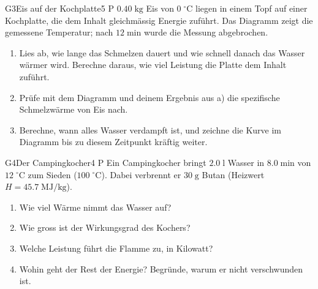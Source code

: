 \documentclass[11pt]{article}
\begin{document}
\begin{lpaufgabe}{G3}{Eis auf der Kochplatte}{5 P}
\(0.40\;\text{kg}\) Eis von \(0\;^\circ\text{C}\) liegen in einem Topf auf einer Kochplatte, die dem Inhalt gleichmässig Energie zuführt. Das Diagramm zeigt die gemessene Temperatur; nach \(12\;\text{min}\) wurde die Messung abgebrochen.\par\smallskip
\begin{center}\end{center}
\begin{enumerate}[label=\alph*),leftmargin=*,itemsep=2pt,topsep=2pt]
\item Lies ab, wie lange das Schmelzen dauert und wie schnell danach das Wasser wärmer wird. Berechne daraus, wie viel Leistung die Platte dem Inhalt zuführt.
\item Prüfe mit dem Diagramm und deinem Ergebnis aus a) die spezifische Schmelzwärme von Eis nach.
\item Berechne, wann alles Wasser verdampft ist, und zeichne die Kurve im Diagramm bis zu diesem Zeitpunkt kräftig weiter.
\end{enumerate}
\end{lpaufgabe}


\begin{lpaufgabe}{G4}{Der Campingkocher}{4 P}
Ein Campingkocher bringt \(2.0\;\text{l}\) Wasser in \(8.0\;\text{min}\) von \(12\;^\circ\text{C}\) zum Sieden (\(100\;^\circ\text{C}\)). Dabei verbrennt er \(30\;\text{g}\) Butan (Heizwert \(H = 45.7\;\text{MJ/kg}\)).
\begin{enumerate}[label=\alph*),leftmargin=*,itemsep=2pt,topsep=2pt]
\item Wie viel Wärme nimmt das Wasser auf?
\item Wie gross ist der Wirkungsgrad des Kochers?
\item Welche Leistung führt die Flamme zu, in Kilowatt?
\item Wohin geht der Rest der Energie? Begründe, warum er nicht verschwunden ist.
\end{enumerate}
\end{lpaufgabe}
\end{document}
